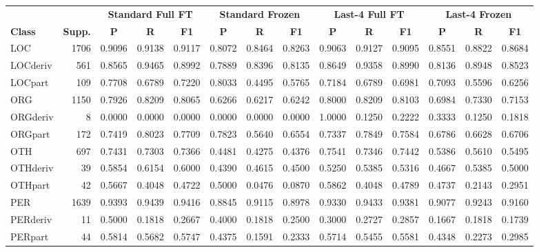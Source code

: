 \documentclass[11pt,a4paper,twocolumn]{article}
\begin{document}
\begin{table}[t]
\centering
\scriptsize
\setlength{\tabcolsep}{3.5pt}
\begin{tabular}{l r ccc ccc ccc ccc}
\toprule
& & \multicolumn{3}{c}{\textbf{Standard Full FT}} 
& \multicolumn{3}{c}{\textbf{Standard Frozen}} 
& \multicolumn{3}{c}{\textbf{Last-4 Full FT}} 
& \multicolumn{3}{c}{\textbf{Last-4 Frozen}} \\
\cmidrule(lr){3-5}\cmidrule(lr){6-8}\cmidrule(lr){9-11}\cmidrule(lr){12-14}
\textbf{Class} & \textbf{Supp.} 
& \textbf{P} & \textbf{R} & \textbf{F1}
& \textbf{P} & \textbf{R} & \textbf{F1}
& \textbf{P} & \textbf{R} & \textbf{F1}
& \textbf{P} & \textbf{R} & \textbf{F1} \\
\midrule
LOC      & 1706 & 0.9096 & 0.9138 & 0.9117 & 0.8072 & 0.8464 & 0.8263 & 0.9063 & 0.9127 & 0.9095 & 0.8551 & 0.8822 & 0.8684 \\
LOCderiv &  561 & 0.8565 & 0.9465 & 0.8992 & 0.7889 & 0.8396 & 0.8135 & 0.8649 & 0.9358 & 0.8990 & 0.8136 & 0.8948 & 0.8523 \\
LOCpart  &  109 & 0.7708 & 0.6789 & 0.7220 & 0.8033 & 0.4495 & 0.5765 & 0.7184 & 0.6789 & 0.6981 & 0.7093 & 0.5596 & 0.6256 \\
ORG      & 1150 & 0.7926 & 0.8209 & 0.8065 & 0.6266 & 0.6217 & 0.6242 & 0.8000 & 0.8209 & 0.8103 & 0.6984 & 0.7330 & 0.7153 \\
ORGderiv &    8 & 0.0000 & 0.0000 & 0.0000 & 0.0000 & 0.0000 & 0.0000 & 1.0000 & 0.1250 & 0.2222 & 0.3333 & 0.1250 & 0.1818 \\
ORGpart  &  172 & 0.7419 & 0.8023 & 0.7709 & 0.7823 & 0.5640 & 0.6554 & 0.7337 & 0.7849 & 0.7584 & 0.6786 & 0.6628 & 0.6706 \\
OTH      &  697 & 0.7431 & 0.7303 & 0.7366 & 0.4481 & 0.4275 & 0.4376 & 0.7541 & 0.7346 & 0.7442 & 0.5386 & 0.5610 & 0.5495 \\
OTHderiv &   39 & 0.5854 & 0.6154 & 0.6000 & 0.4390 & 0.4615 & 0.4500 & 0.5250 & 0.5385 & 0.5316 & 0.4667 & 0.5385 & 0.5000 \\
OTHpart  &   42 & 0.5667 & 0.4048 & 0.4722 & 0.5000 & 0.0476 & 0.0870 & 0.5862 & 0.4048 & 0.4789 & 0.4737 & 0.2143 & 0.2951 \\
PER      & 1639 & 0.9393 & 0.9439 & 0.9416 & 0.8845 & 0.9115 & 0.8978 & 0.9330 & 0.9433 & 0.9381 & 0.9077 & 0.9243 & 0.9160 \\
PERderiv &   11 & 0.5000 & 0.1818 & 0.2667 & 0.4000 & 0.1818 & 0.2500 & 0.3000 & 0.2727 & 0.2857 & 0.1667 & 0.1818 & 0.1739 \\
PERpart  &   44 & 0.5814 & 0.5682 & 0.5747 & 0.4375 & 0.1591 & 0.2333 & 0.5714 & 0.5455 & 0.5581 & 0.4348 & 0.2273 & 0.2985 \\

\end{tabular}
\end{table}
\end{document}
